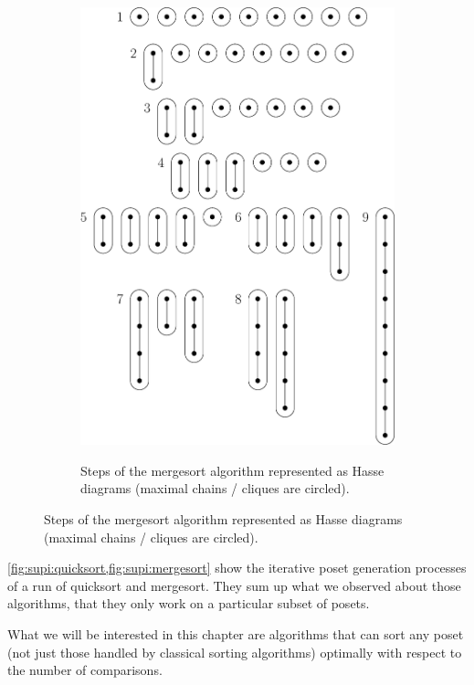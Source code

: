 \begin{figure}
\begin{subfigure}[b]{0.4\textwidth}
		{\includegraphics[width=\textwidth]{fig/supi/mergesort}}
		\caption{Steps of the mergesort algorithm represented as Hasse diagrams (maximal chains / cliques are circled).}
		\label{fig:supi:mergesort}
	\end{subfigure}
\end{figure}


\cref{fig:supi:quicksort,fig:supi:mergesort} show the iterative poset generation processes of a run of quicksort and mergesort. They sum up what we observed about those algorithms, that they only work on a particular subset of posets.

What we will be interested in this chapter are algorithms that can sort any poset (not just those handled by classical sorting algorithms) optimally with respect to the number of comparisons.
